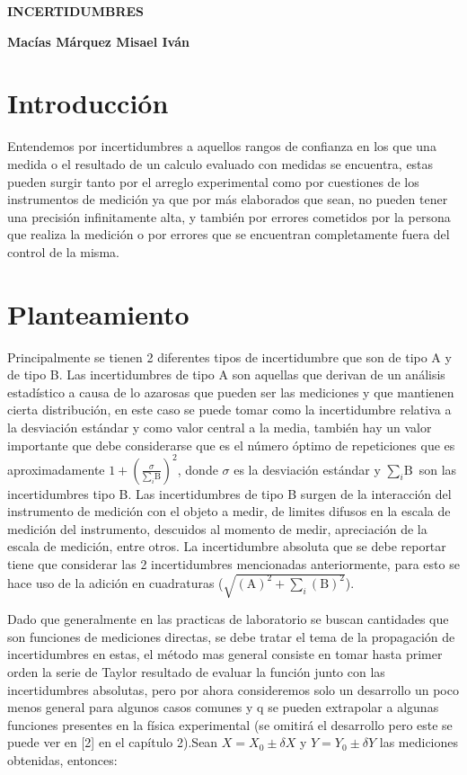 \documentclass[12pt]{article}
\begin{document}
\begin{center}
\bf{\sc\Huge INCERTIDUMBRES}\\
\end{center}
\begin{center}
\bf{\sc\large Macías Márquez Misael Iván }\\
\end{center}


\section*{Introducción}

 Entendemos por incertidumbres a aquellos rangos de confianza en los que una medida o el resultado de un calculo evaluado con medidas se encuentra, estas pueden surgir tanto por el arreglo experimental como por cuestiones de los instrumentos de medición ya que por más elaborados que sean, no pueden tener una precisión infinitamente alta, y también por errores cometidos por la persona que realiza la medición o por errores que se encuentran completamente fuera del control de la misma.

\section*{Planteamiento}

 Principalmente se tienen 2 diferentes tipos de incertidumbre que son de tipo A y de tipo B. Las incertidumbres de tipo A son aquellas que derivan de un análisis estadístico a causa de lo azarosas que pueden ser las mediciones y que mantienen cierta distribución, en este caso se puede tomar como la incertidumbre relativa a la desviación estándar y como valor central a la media, también hay un valor importante que debe considerarse que es el número óptimo de repeticiones que es aproximadamente $1 + (\frac{\sigma}{\sum_{i}\text{B}})^2$, donde $\sigma$ es la desviación estándar y $\sum_{i}\text{B} $ son las incertidumbres tipo B. Las incertidumbres de tipo B surgen de la interacción del instrumento de medición con el objeto a medir, de limites difusos en la escala de medición del instrumento, descuidos al momento de medir, apreciación de la escala de medición, entre otros.  La incertidumbre absoluta que se debe reportar tiene que considerar las 2 incertidumbres mencionadas anteriormente, para esto se hace uso de la adición en cuadraturas ($\sqrt{(\text{A})^2 + \sum_{i}(\text{B})^2}$).

 Dado que generalmente en las practicas de laboratorio se buscan cantidades que son funciones de mediciones directas, se debe tratar el tema de la propagación de incertidumbres en estas, el método mas general consiste en tomar hasta  primer orden la serie de Taylor resultado de evaluar la función junto con las incertidumbres absolutas, pero por ahora consideremos solo un desarrollo un poco menos general para algunos casos comunes y q se pueden extrapolar a algunas funciones presentes en la física experimental (se omitirá el desarrollo pero este se puede ver en [2] en el capítulo 2).Sean $X = X_0 \pm \delta X$ y $Y = Y_0 \pm \delta Y$ las mediciones obtenidas, entonces:
\end{document}
